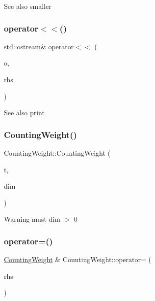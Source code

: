 \begin{DoxySeeAlso}{See also}
smaller 
\end{DoxySeeAlso}
\mbox{\label{group__weight_ga5fa6fc187426e2cc6aa40f7acddf8455}} 
\subsubsection{\texorpdfstring{operator$<$$<$()}{operator<<()}}
{\footnotesize\ttfamily std\+::ostream\& operator$<$$<$ (\begin{DoxyParamCaption}\item[{std\+::ostream \&}]{o,  }\item[{const \mbox{\hyperlink{classWeight}{Weight}} \&}]{rhs }\end{DoxyParamCaption})\hspace{0.3cm}{\ttfamily [inline]}}

\begin{DoxySeeAlso}{See also}
print 
\end{DoxySeeAlso}
\mbox{\label{group__weight_gaff2b14e164c777c04be1a0e3c73b71fa}} 
\subsubsection{\texorpdfstring{CountingWeight()}{CountingWeight()}}
{\footnotesize\ttfamily Counting\+Weight\+::\+Counting\+Weight (\begin{DoxyParamCaption}\item[{C\+W\+Type}]{t,  }\item[{size\+\_\+t}]{dim }\end{DoxyParamCaption})\hspace{0.3cm}{\ttfamily [protected]}}

\begin{DoxyWarning}{Warning}
must dim $>$ 0 
\end{DoxyWarning}
\mbox{\label{group__weight_gabde05f9a8f2eb526e5154c4f3480205b}} 
\subsubsection{\texorpdfstring{operator=()}{operator=()}\hspace{0.1cm}{\footnotesize\ttfamily [1/4]}}
{\footnotesize\ttfamily \mbox{\hyperlink{classCountingWeight}{Counting\+Weight}} \& Counting\+Weight\+::operator= (\begin{DoxyParamCaption}\item[{const \mbox{\hyperlink{classLetterWeight}{Letter\+Weight}} \&}]{rhs }\end{DoxyParamCaption})}



